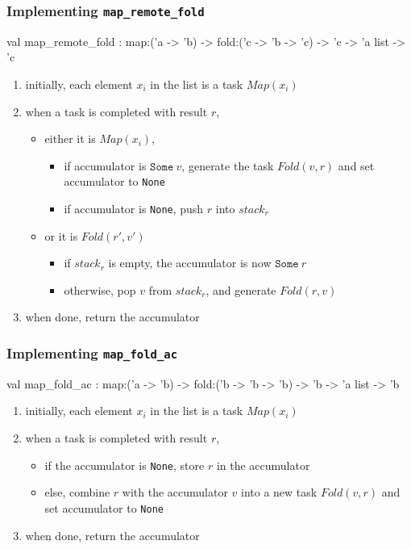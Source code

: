 \documentclass{beamer}
\begin{document}
\begin{frame}\frametitle{Implementing \texttt{map\_remote\_fold}}
  \begin{ocaml}
val map_remote_fold :
  map:('a -> 'b) -> fold:('c -> 'b -> 'c) -> 
  'c -> 'a list -> 'c
  \end{ocaml}



  \begin{enumerate}
  \item initially, each element $x_i$ in the list is a task $Map(x_i)$
  \item when a task is completed with result $r$,
    \begin{itemize}
    \item either it is $Map(x_i)$,
      \begin{itemize}
      \item if accumulator is $\texttt{Some}~v$, generate the task
        $Fold(v,r)$ and set accumulator to \texttt{None}
      \item if accumulator is \texttt{None}, push $r$ into $\mathit{stack}_r$
      \end{itemize}
    \item or it is $Fold(r',v')$
      \begin{itemize}
      \item if $\mathit{stack}_r$ is empty, the accumulator is now
        $\texttt{Some}~r$ 
      \item otherwise, pop $v$ from $\mathit{stack}_r$, and generate
        $Fold(r,v)$ 
      \end{itemize}
    \end{itemize}
  \item when done, return the accumulator
  \end{enumerate}
\end{frame}

\begin{frame}\frametitle{Implementing \texttt{map\_fold\_ac}}
  \begin{ocaml}
val map_fold_ac :
  map:('a -> 'b) -> fold:('b -> 'b -> 'b) -> 
  'b -> 'a list -> 'b
  \end{ocaml}



  \begin{enumerate}
  \item initially, each element $x_i$ in the list is a task $Map(x_i)$
  \item when a task is completed with result $r$,
    \begin{itemize}
    \item if the accumulator is \texttt{None}, store $r$ in the accumulator
    \item else, combine $r$ with the accumulator $v$ into a new task
      $Fold(v, r)$ and set accumulator to \texttt{None}
    \end{itemize}
  \item when done, return the accumulator
  \end{enumerate}
\end{frame}
\end{document}
